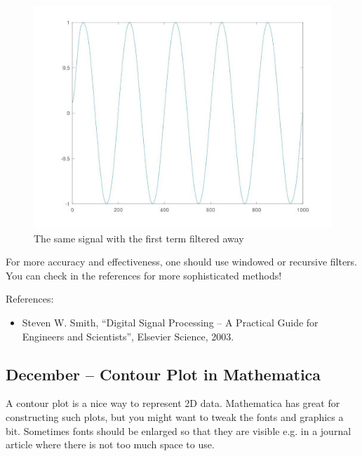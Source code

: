 \documentclass{article}
\begin{document}
\begin{figure}
  \includegraphics[width=\linewidth]{filtered.jpg}
   \caption{The same signal with the first term filtered away}
\end{figure}





For more accuracy and effectiveness, one should use windowed or recursive filters. You can check in the references for more sophisticated methods!


References:
\begin{itemize}
  \item Steven W. Smith, ``Digital Signal Processing – A Practical Guide for Engineers and Scientists'', Elsevier Science, 2003.
\end{itemize}


\subsection{December – Contour Plot in Mathematica}

A contour plot is a nice way to represent 2D data. Mathematica has great for constructing such plots, but you might want to tweak the fonts and graphics a bit. Sometimes fonts should be enlarged so that they are visible e.g. in a journal article where there is not too much space to use.
\end{document}
